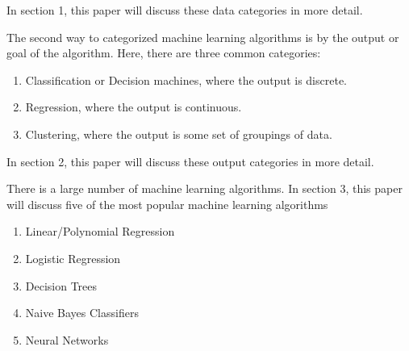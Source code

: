 In section 1, this paper will discuss these data categories in more detail. 

The second way to categorized machine learning algorithms is by the output or goal of the algorithm. Here, there are three common categories:

\begin{enumerate}  
\item Classification or Decision machines, where the output is discrete.
\item Regression, where the output is continuous.
\item Clustering, where the output is some set of groupings of data.
\end{enumerate}

In section 2, this paper will discuss these output categories in more detail.

There is a large number of machine learning algorithms. In section 3, this paper will discuss five of the most popular machine learning algorithms

\begin{enumerate}  
\item Linear/Polynomial Regression
\item Logistic Regression
\item Decision Trees
\item Naive Bayes Classifiers
\item Neural Networks
\end{enumerate}

\newpage

